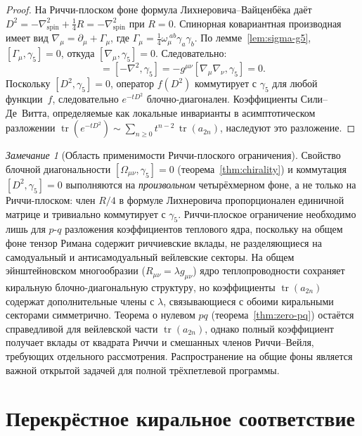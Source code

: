 \documentclass[12pt,a4paper]{article}
\theoremstyle{definition}
\theoremstyle{remark}
\newtheorem{remark}[theorem]{Замечание}
\newcommand{\tr}{\operatorname{tr}}
\begin{document}
\begin{proof}
На Риччи-плоском фоне формула Лихнеровича--Вайценбёка даёт
$D^2 = -\nabla^2_{\mathrm{spin}} + \frac{1}{4}R = -\nabla^2_{\mathrm{spin}}$
при $R = 0$.  Спинорная ковариантная производная имеет вид
$\nabla_\mu = \partial_\mu + \Gamma_\mu$, где
$\Gamma_\mu = \frac{1}{4}\omega_\mu^{\;ab}\gamma_a\gamma_b$.
По лемме~\ref{lem:sigma-g5}, $[\Gamma_\mu, \gamma_5] = 0$, откуда
$[\nabla_\mu, \gamma_5] = 0$.  Следовательно:
\begin{equation}
  [D^2, \gamma_5] = [-\nabla^2, \gamma_5]
  = -g^{\mu\nu}[\nabla_\mu\nabla_\nu, \gamma_5] = 0.
\end{equation}
Поскольку $[D^2, \gamma_5] = 0$, оператор $f(D^2)$ коммутирует с $\gamma_5$
для любой функции~$f$, следовательно $e^{-tD^2}$ блочно-диагонален.
Коэффициенты Сили--Де~Витта, определяемые как локальные инварианты в
асимптотическом разложении
$\tr(e^{-tD^2}) \sim \sum_{n \geq 0} t^{n-2}\,\tr(a_{2n})$,
наследуют это разложение.
\end{proof}

\begin{remark}[Область применимости Риччи-плоского ограничения]
\label{rem:ricci-flat}
Свойство блочной диагональности $[\Omega_{\mu\nu}, \gamma_5] = 0$
(теорема~\ref{thm:chirality}) и коммутация $[D^2, \gamma_5] = 0$ выполняются
на \emph{произвольном} четырёхмерном фоне, а не только на Риччи-плоском:
член $R/4$ в формуле Лихнеровича пропорционален единичной матрице и
тривиально коммутирует с $\gamma_5$.  Риччи-плоское ограничение необходимо
лишь для $p$-$q$ разложения коэффициентов теплового ядра, поскольку на
общем фоне тензор Римана содержит риччиевские вклады, не разделяющиеся на
самодуальный и антисамодуальный вейлевские секторы.  На общем эйнштейновском
многообразии ($R_{\mu\nu} = \lambda g_{\mu\nu}$) ядро теплопроводности сохраняет
киральную блочно-диагональную структуру, но коэффициенты $\tr(a_{2n})$
содержат дополнительные члены с $\lambda$, связывающиеся с обоими киральными
секторами симметрично.  Теорема о нулевом $pq$
(теорема~\ref{thm:zero-pq}) остаётся справедливой для вейлевской части
$\tr(a_{2n})$, однако полный коэффициент получает вклады от квадрата Риччи и
смешанных членов Риччи--Вейля, требующих отдельного рассмотрения.
Распространение на общие фоны является важной открытой задачей для полной
трёхпетлевой программы.
\end{remark}


\section{Перекрёстное киральное соответствие}
\label{sec:crossed}
\end{document}
